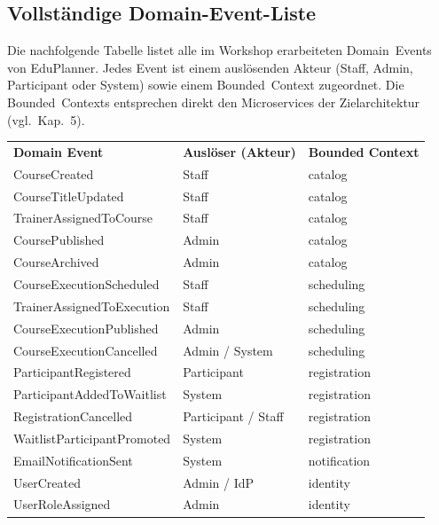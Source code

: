 \subsection{Vollständige Domain-Event-Liste}

Die nachfolgende Tabelle listet alle im Workshop erarbeiteten Domain~Events von EduPlanner. Jedes Event ist einem auslösenden Akteur (Staff, Admin, Participant oder System) sowie einem Bounded~Context zugeordnet. Die Bounded~Contexts entsprechen direkt den Microservices der Zielarchitektur (vgl.\ Kap.~5).

\begin{tabularx}{\textwidth}{L{5cm} L{3.5cm} X}
  \color{white}\textbf{Domain Event} & \color{white}\textbf{Auslöser (Akteur)} & \color{white}\textbf{Bounded Context} \\
  CourseCreated & Staff & catalog \\
  CourseTitleUpdated & Staff & catalog \\
  TrainerAssignedToCourse & Staff & catalog \\
  CoursePublished & Admin & catalog \\
  CourseArchived & Admin & catalog \\
  CourseExecutionScheduled & Staff & scheduling \\
  TrainerAssignedToExecution & Staff & scheduling \\
  CourseExecutionPublished & Admin & scheduling \\
  CourseExecutionCancelled & Admin / System & scheduling \\
  ParticipantRegistered & Participant & registration \\
  ParticipantAddedToWaitlist & System & registration \\
  RegistrationCancelled & Participant / Staff & registration \\
  WaitlistParticipantPromoted & System & registration \\
  EmailNotificationSent & System & notification \\
  UserCreated & Admin / IdP & identity \\
  UserRoleAssigned & Admin & identity \\
\end{tabularx}